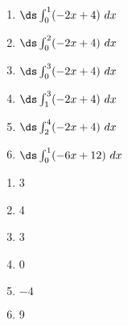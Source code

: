{\noindent
\begin{minipage}{\linewidth}
\end{minipage}

\begin{enumerate}
\item		$\ds \int_0^1 (-2x+4)\ dx$
\item		$\ds \int_0^2 (-2x+4)\ dx$
\item		$\ds \int_0^3 (-2x+4)\ dx$
\item		$\ds \int_1^3 (-2x+4)\ dx$
\item		$\ds \int_2^4 (-2x+4)\ dx$
\item		$\ds \int_0^1 (-6x+12)\ dx$
\end{enumerate}
}
{\begin{enumerate}
\item		3
\item		4
\item		3
\item		0
\item		$-4$
\item		9
\end{enumerate}
}

